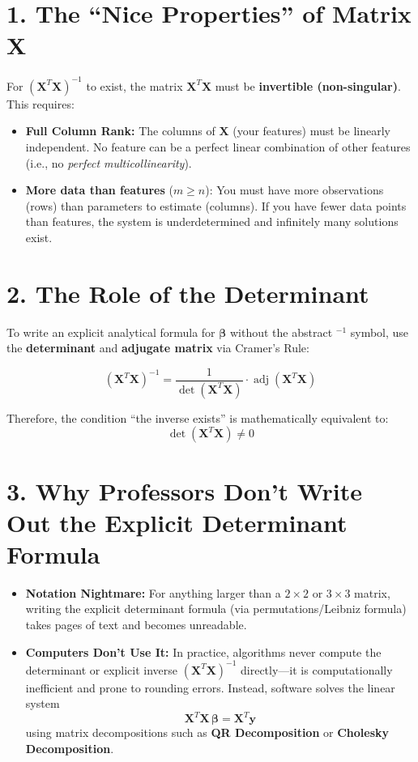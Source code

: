 \documentclass[12pt]{article}
\begin{document}
\section*{1. The ``Nice Properties'' of Matrix $\mathbf{X}$}
 
For $(\mathbf{X}^T\mathbf{X})^{-1}$ to exist, the matrix $\mathbf{X}^T\mathbf{X}$ must be \textbf{invertible (non-singular)}. This requires:
 
\begin{itemize}
  \item \textbf{Full Column Rank:} The columns of $\mathbf{X}$ (your features) must be linearly independent. No feature can be a perfect linear combination of other features (i.e., no \emph{perfect multicollinearity}).
  \item \textbf{More data than features} ($m \geq n$): You must have more observations (rows) than parameters to estimate (columns). If you have fewer data points than features, the system is underdetermined and infinitely many solutions exist.
\end{itemize}
 
\section*{2. The Role of the Determinant}
 
To write an explicit analytical formula for $\boldsymbol{\beta}$ without the abstract ${}^{-1}$ symbol, use the \textbf{determinant} and \textbf{adjugate matrix} via Cramer's Rule:
 
\[
(\mathbf{X}^T\mathbf{X})^{-1} = \frac{1}{\det(\mathbf{X}^T\mathbf{X})} \cdot \operatorname{adj}(\mathbf{X}^T\mathbf{X})
\]
 
Therefore, the condition ``the inverse exists'' is mathematically equivalent to:
\[
\det(\mathbf{X}^T\mathbf{X}) \neq 0
\]
 
\section*{3. Why Professors Don't Write Out the Explicit Determinant Formula}
 
\begin{itemize}
  \item \textbf{Notation Nightmare:} For anything larger than a $2\times 2$ or $3\times 3$ matrix, writing the explicit determinant formula (via permutations/Leibniz formula) takes pages of text and becomes unreadable.
  \item \textbf{Computers Don't Use It:} In practice, algorithms never compute the determinant or explicit inverse $(\mathbf{X}^T\mathbf{X})^{-1}$ directly---it is computationally inefficient and prone to rounding errors. Instead, software solves the linear system
  \[
    \mathbf{X}^T\mathbf{X}\,\boldsymbol{\beta} = \mathbf{X}^T\mathbf{y}
  \]
  using matrix decompositions such as \textbf{QR Decomposition} or \textbf{Cholesky Decomposition}.
\end{itemize}
\end{document}
